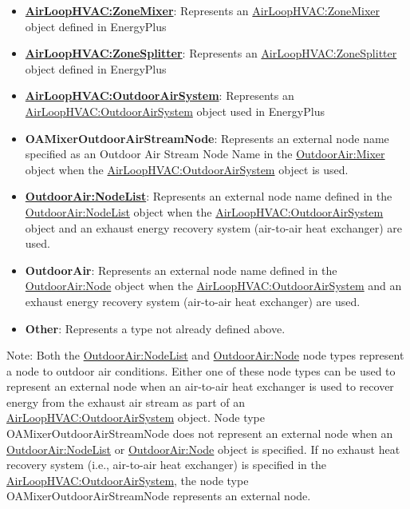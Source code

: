 \begin{itemize}
\item
  \textbf{\hyperref[airloophvaczonemixer]{AirLoopHVAC:ZoneMixer}}: Represents an \hyperref[airloophvaczonemixer]{AirLoopHVAC:ZoneMixer} object defined in EnergyPlus
\item
  \textbf{\hyperref[airloophvaczonesplitter]{AirLoopHVAC:ZoneSplitter}}: Represents an \hyperref[airloophvaczonesplitter]{AirLoopHVAC:ZoneSplitter} object defined in EnergyPlus
\item
  \textbf{\hyperref[airloophvacoutdoorairsystem]{AirLoopHVAC:OutdoorAirSystem}}: Represents an \hyperref[airloophvacoutdoorairsystem]{AirLoopHVAC:OutdoorAirSystem} object used in EnergyPlus
\item
  \textbf{OAMixerOutdoorAirStreamNode}: Represents an external node name specified as an Outdoor Air Stream Node Name in the \hyperref[outdoorairmixer]{OutdoorAir:Mixer} object when the \hyperref[airloophvacoutdoorairsystem]{AirLoopHVAC:OutdoorAirSystem} object is used.
\item
  \textbf{\hyperref[outdoorairnodelist]{OutdoorAir:NodeList}}: Represents an external node name defined in the \hyperref[outdoorairnodelist]{OutdoorAir:NodeList} object when the \hyperref[airloophvacoutdoorairsystem]{AirLoopHVAC:OutdoorAirSystem} object and an exhaust energy recovery system (air-to-air heat exchanger) are used.
\item
  \textbf{OutdoorAir}: Represents an external node name defined in the \hyperref[outdoorairnode]{OutdoorAir:Node} object when the \hyperref[airloophvacoutdoorairsystem]{AirLoopHVAC:OutdoorAirSystem} and an exhaust energy recovery system (air-to-air heat exchanger) are used.
\item
  \textbf{Other}: Represents a type not already defined above.
\end{itemize}

Note: Both the \hyperref[outdoorairnodelist]{OutdoorAir:NodeList} and \hyperref[outdoorairnode]{OutdoorAir:Node} node types represent a node to outdoor air conditions. Either one of these node types can be used to represent an external node when an air-to-air heat exchanger is used to recover energy from the exhaust air stream as part of an \hyperref[airloophvacoutdoorairsystem]{AirLoopHVAC:OutdoorAirSystem} object. Node type OAMixerOutdoorAirStreamNode does not represent an external node when an \hyperref[outdoorairnodelist]{OutdoorAir:NodeList} or \hyperref[outdoorairnode]{OutdoorAir:Node} object is specified. If no exhaust heat recovery system (i.e., air-to-air heat exchanger) is specified in the \hyperref[airloophvacoutdoorairsystem]{AirLoopHVAC:OutdoorAirSystem}, the node type OAMixerOutdoorAirStreamNode represents an external node.

